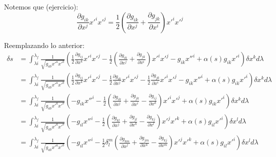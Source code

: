 \documentclass[12pt]{report}
\begin{document}
	
Notemos que (ejercicio):
	\begin{equation*}
		\frac{\partial g_{ik}}{\partial x^{j}} x'^{i} x'^{j} = \frac{1}{2} \left( \frac{\partial g_{ik}}{\partial x^{j}} + \frac{\partial g_{jk}}{\partial x^{i}} \right) x'^{i}x'^{j}
	\end{equation*}


Reemplazando lo anterior:
	\begin{align*}
		\delta s &=  \int^{\lambda_{f}}_{\lambda{i}} \frac{1}{\sqrt{g_{ab}x'^{a}x'^{b}}} \left( \frac{1}{2}\frac{\partial g_{ij}}{\partial x^{k}} x'^{i}x'^{j} 
				                                    - \frac{1}{2} \left( \frac{\partial g_{ik}}{\partial x^{j}} + \frac{\partial g_{jk}}{\partial x^{i}} \right) x'^{i}x'^{j} - g_{ik}x''^{i} 
				                                        + \alpha\left( s \right) g_{ik}x'^{i} 
														\right) \delta x^{k}  d\lambda\\	
				 &=  \int^{\lambda_{f}}_{\lambda{i}} \frac{1}{\sqrt{g_{ab}x'^{a}x'^{b}}} \left( 
													\frac{1}{2}\frac{\partial g_{ij}}{\partial x^{k}} x'^{i}x'^{j} 
				                                    - \frac{1}{2}\frac{\partial g_{ik}}{\partial x^{j}}x'^{i}x'^{j} - \frac{1}{2}\frac{\partial g_{jk}}{\partial x^{i}} x'^{i}x'^{j} - g_{ik}x''^{i} 
				                                        + \alpha\left( s \right) g_{ik}x'^{i} 
														\right) \delta x^{k}  d\lambda \\
				 &=  \int^{\lambda_{f}}_{\lambda{i}} \frac{1}{\sqrt{g_{ab}x'^{a}x'^{b}}} \left( - g_{ik}x''^{i}
													-\frac{1}{2}\left( \frac{\partial g_{ik}}{\partial x^{j}} + \frac{\partial g_{jk}}{\partial x^{i}}-\frac{\partial g_{ij}}{\partial x^{k}} \right)x'^{i}x'^{j}
				                                        + \alpha \left( s \right) g_{ik}x'^{i} 
														\right) \delta x^{k}  d\lambda \\
				 &=  \int^{\lambda_{f}}_{\lambda{i}} \frac{1}{\sqrt{g_{ab}x'^{a}x'^{b}}} \left( - g_{il}x''^{i}
													-\frac{1}{2}\left( \frac{\partial g_{kl}}{\partial x^{j}} + \frac{\partial g_{jl}}{\partial x^{k}}-\frac{\partial g_{kj}}{\partial x^{l}} \right)x'^{j}x'^{k}
				                                        + \alpha\left( s \right) g_{il}x'^{i} 
														\right) \delta x^{l}  d\lambda \\	
				 &=  \int^{\lambda_{f}}_{\lambda{i}} \frac{1}{\sqrt{g_{ab}x'^{a}x'^{b}}} \left( - g_{il}x''^{i}
													-\frac{1}{2}\delta^{m}_{l}\left( \frac{\partial g_{km}}{\partial x^{j}} + \frac{\partial g_{jm}}{\partial x^{k}}-\frac{\partial g_{kj}}{\partial x^{m}} \right)x'^{j}x'^{k}
				                                        + \alpha\left( s \right) g_{il}x'^{i} 
														\right) \delta x^{l}  d\lambda \\																																												
	\end{align*}
\end{document}
